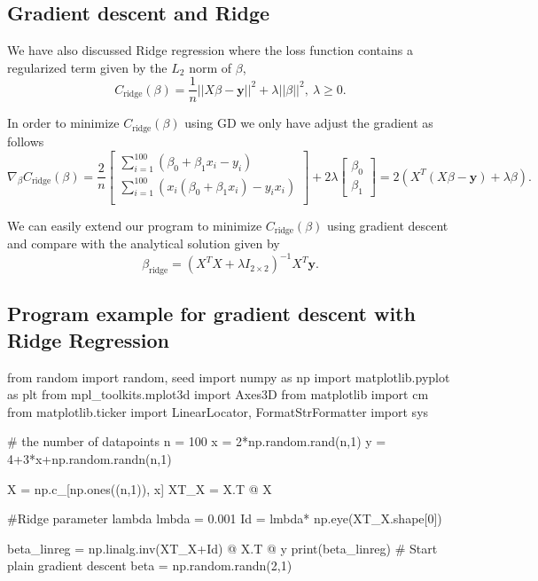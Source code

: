 \documentclass[%
oneside,                 %
final,                   %
10pt]{article}
\begin{document}
\epycod



\subsection{Gradient descent and Ridge}

We have also discussed Ridge regression where the loss function contains a regularized term given by the $L_2$ norm of $\beta$, 
\[
C_{\text{ridge}}(\beta) = \frac{1}{n}||X\beta -\mathbf{y}||^2 + \lambda ||\beta||^2, \ \lambda \geq 0.
\]

In order to minimize $C_{\text{ridge}}(\beta)$ using GD we only have adjust the gradient as follows 
\[
\nabla_\beta C_{\text{ridge}}(\beta)  = \frac{2}{n}\begin{bmatrix} \sum_{i=1}^{100} \left(\beta_0+\beta_1x_i-y_i\right) \\
\sum_{i=1}^{100}\left( x_i (\beta_0+\beta_1x_i)-y_ix_i\right) \\
\end{bmatrix} + 2\lambda\begin{bmatrix} \beta_0 \\ \beta_1\end{bmatrix} = 2 (X^T(X\beta - \mathbf{y})+\lambda \beta).
\]

We can easily extend our program to minimize $C_{\text{ridge}}(\beta)$ using gradient descent and compare with the analytical solution given by 
\[
\beta_{\text{ridge}} = \left(X^T X + \lambda I_{2 \times 2} \right)^{-1} X^T \mathbf{y}.
\]


\subsection{Program example for gradient descent with Ridge Regression}
\bpycod
from random import random, seed
import numpy as np
import matplotlib.pyplot as plt
from mpl_toolkits.mplot3d import Axes3D
from matplotlib import cm
from matplotlib.ticker import LinearLocator, FormatStrFormatter
import sys

# the number of datapoints
n = 100
x = 2*np.random.rand(n,1)
y = 4+3*x+np.random.randn(n,1)

X = np.c_[np.ones((n,1)), x]
XT_X = X.T @ X

#Ridge parameter lambda
lmbda  = 0.001
Id = lmbda* np.eye(XT_X.shape[0])

beta_linreg = np.linalg.inv(XT_X+Id) @ X.T @ y
print(beta_linreg)
# Start plain gradient descent
beta = np.random.randn(2,1)
\end{document}
